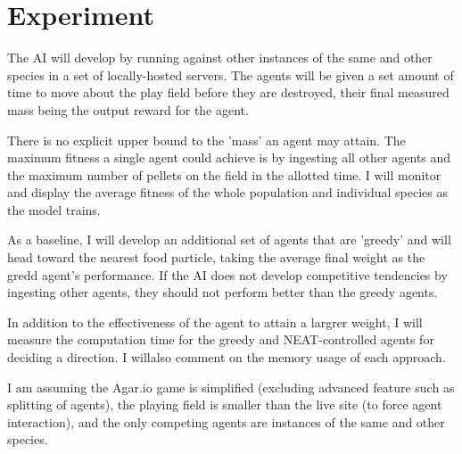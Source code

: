\documentclass[11pt]{article}
\begin{document}
\section*{Experiment}

The AI will develop by running against other instances of the same and other species in a set of locally-hosted servers. The agents will be given a set amount of time to move about the play field before they are destroyed, their final measured mass being the output reward for the agent.

There is no explicit upper bound to the 'mass' an agent may attain. The maximum fitness a single agent could achieve is by ingesting all other agents and the maximum number of pellets on the field in the allotted time. I will monitor and display the average fitness of the whole population and individual species as the model trains.

As a baseline, I will develop an additional set of agents that are 'greedy' and will head toward the nearest food particle, taking the average final weight as the gredd agent's performance. If the AI does not develop competitive tendencies by ingesting other agents, they should not perform better than the greedy agents.

In addition to the effectiveness of the agent to attain a largrer weight, I will measure the computation time for the greedy and NEAT-controlled agents for deciding a direction. I willalso comment on the memory usage of each approach. 

I am assuming the Agar.io game is simplified (excluding advanced feature such as splitting of agents), the playing field is smaller than the live site (to force agent interaction), and the only competing agents are instances of the same and other species.


% 

\end{document}

